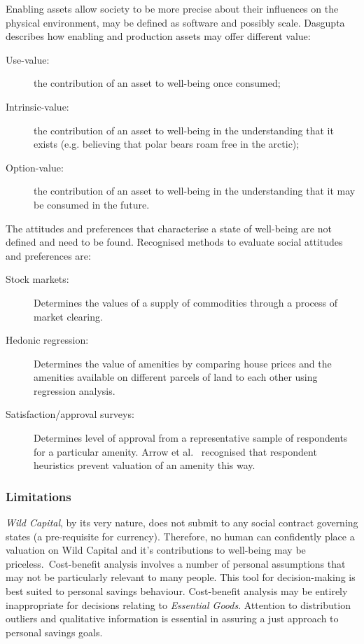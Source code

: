 \documentclass[11pt, oneside]{book}   	%
\begin{document}
Enabling assets allow society to be more precise about their influences on the physical environment, may be defined as software and possibly scale. Dasgupta~\cite{pd2} describes how enabling and production assets may offer different value:

\begin{description}
\item[Use-value:] the contribution of an asset to well-being once consumed;
\item[Intrinsic-value:] the contribution of an asset to well-being in the understanding that it exists (e.g. believing that polar bears roam free in the arctic);
\item[Option-value:] the contribution of an asset to well-being in the understanding that it may be consumed in the future.
\end{description}

The attitudes and preferences that characterise a state of well-being are not defined and need to be found. Recognised methods to evaluate social attitudes and preferences are:

\begin{description}
\item[Stock markets:] Determines the values of a supply of commodities through a process of market clearing.
\item[Hedonic regression:] Determines the value of amenities by comparing house prices and the amenities available on different parcels of land to each other using regression analysis.
\item[Satisfaction/approval surveys:] Determines level of approval from a representative sample of respondents for a particular amenity. Arrow et al.~\cite{kja1} recognised that respondent heuristics prevent valuation of an amenity this way.
\end{description}

\subsubsection{Limitations}

\emph{Wild Capital}, by its very nature, does not submit to any social contract governing states (a pre-requisite for currency).
Therefore, no human can confidently place a valuation on Wild Capital and it's contributions to well-being may be priceless.\
Cost-benefit analysis involves a number of personal assumptions that may not be particularly relevant to many people. This tool for decision-making is best suited to personal savings behaviour.
Cost-benefit analysis may be entirely inappropriate for decisions relating to \emph{Essential Goods}.
Attention to distribution outliers and qualitative information is essential in assuring a just approach to personal savings goals.
\end{document}
